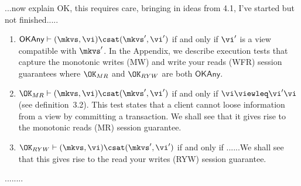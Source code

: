 ...now explain OK, this requires care, bringing in ideas from 4.1,
I've started but not finished.....

\begin{enumerate}
\item $\mathsf{OKAny}\vdash (\mkvs, \vi) 
\csat (\mkvs', \vi') $ if and only if $\vi'$ is a view compatible with
$\mkvs'$. In the Appendix, we describe  execution tests that capture the 
 monotonic writes (MW)  and write your reads (WFR) session guarantees 
where $\OK_{MR}$ and $\OK_{RYW}$ are both $\mathsf{OKAny}$. 
\item $\OK_{MR} \vdash (\mkvs, \vi) 
\csat (\mkvs', \vi') $ if and only if $    \vi \viewleq  \vi'\vi $
(see definition~3.2).
This test states that a client cannot loose information from a view by
committing a transaction. We shall see that it gives rise to the
monotonic reads (MR) session guarantee. 
\item $\OK_{RYW}  \vdash (\mkvs, \vi) 
\csat (\mkvs', \vi') $ if and only if ......We shall see that this
gives rise to the read your writes (RYW) session guarantee. 
\end{enumerate}
........




